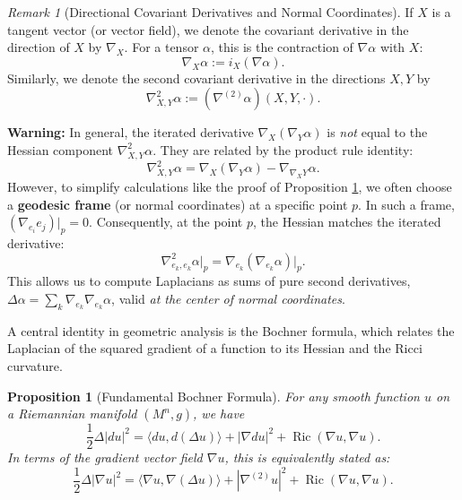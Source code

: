 \documentclass[11pt]{article}
\theoremstyle{plain}
\newtheorem{proposition}[theorem]{Proposition}
\theoremstyle{definition}
\theoremstyle{remark}
\newtheorem{remark}[theorem]{Remark}
\begin{document}
\begin{remark}[Directional Covariant Derivatives and Normal Coordinates]
\label{rem:normal_coords}
    If $X$ is a tangent vector (or vector field), we denote the covariant derivative in the direction of $X$ by $\nabla_X$. For a tensor $\alpha$, this is the contraction of $\nabla \alpha$ with $X$:
    \begin{equation}
        \nabla_X \alpha := i_X (\nabla \alpha).
    \end{equation}
    Similarly, we denote the second covariant derivative in the directions $X, Y$ by
    \begin{equation}
        \nabla^2_{X,Y} \alpha := (\nabla^{(2)} \alpha)(X, Y, \cdot).
    \end{equation}
    
    \textbf{Warning:} In general, the iterated derivative $\nabla_X (\nabla_Y \alpha)$ is \emph{not} equal to the Hessian component $\nabla^2_{X,Y} \alpha$. They are related by the product rule identity:
    \begin{equation}
        \nabla^2_{X,Y} \alpha = \nabla_X (\nabla_Y \alpha) - \nabla_{\nabla_X Y} \alpha.
    \end{equation}
    However, to simplify calculations like the proof of Proposition \ref{prop:FundBochnerFormNormSq}, we often choose a \textbf{geodesic frame} (or normal coordinates) at a specific point $p$. In such a frame, $(\nabla_{e_i} e_j)|_p = 0$. Consequently, at the point $p$, the Hessian matches the iterated derivative:
    \begin{equation}
        \nabla^2_{e_k, e_k} \alpha \bigg|_p = \nabla_{e_k} ( \nabla_{e_k} \alpha ) \bigg|_p .
    \end{equation}
    This allows us to compute Laplacians as sums of pure second derivatives, $\Delta \alpha = \sum_k \nabla_{e_k} \nabla_{e_k} \alpha$, valid \emph{at the center of normal coordinates}.
\end{remark}

A central identity in geometric analysis is the Bochner formula,
which relates the Laplacian of the squared gradient of a function
to its Hessian and the Ricci curvature.


\begin{proposition}[Fundamental Bochner Formula]
\label{prop:FundBochnerFormNormSq}
    For any smooth function $u$ on a Riemannian manifold $(M^n, g)$, we have
    \begin{equation}
        \frac{1}{2}\Delta |d u |^{2} = \langle d u, d ( \Delta u ) \rangle + |\nabla du |^{2} + \operatorname{Ric}(\nabla u,\nabla u) .
    \end{equation}
    In terms of the gradient vector field $\nabla u$, this is equivalently stated as:
    \begin{equation} \label{eq:FundBochnerFormulaU}
        \frac{1}{2}\Delta |\nabla u |^{2} = \langle \nabla u, \nabla (\Delta u) \rangle + | \nabla^{(2)} u |^{2} + \operatorname{Ric}(\nabla u,\nabla u) .
    \end{equation}
\end{proposition}
\end{document}
